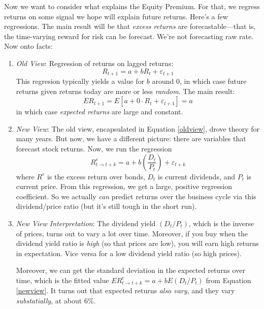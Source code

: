 \documentclass[12pt]{article}
\theoremstyle{plain}
\theoremstyle{definition}
\theoremstyle{remark}
\begin{document}
Now we want to consider what explains the Equity Premium. For that,
we regress returns on some signal we hope will explain future returns.
Here's a few regressions. The main result will be that
\emph{excess returns} are forecastable---that is, the time-varying
reward for risk can be forecast. We're not forecasting raw rate.
Now onto facts:
\begin{enumerate}
    \item {\sl Old View}: Regression of returns on lagged returns:
	    \[ R_{t+1} = a + b R_t + \varepsilon_{t+1} \]
	This regresion typically yields a value for $b$ around
	0, in which case future returns given returns today
	are more or less \emph{random}.  The main result:
	\begin{equation}
	    \label{oldview}
	    ER_{t+1} = E[a + 0\cdot R_t + \varepsilon_{t+1}] = a
	\end{equation}
	in which case \emph{expected returns} are large and constant.
    \item {\sl New View}: The old view, encapsulated in Equation \ref{oldview},
	drove theory for many years. But now, we have a different
	picture: there are variables that forecast stock returns.
	Now, we run the regression
	\begin{equation}
	    \label{newview}
	    R^e_{t\rightarrow t+k} = a + b \left(\frac{D_t}{P_t}\right)
		+ \varepsilon_{t+k}
	\end{equation}
	where $R^e$ is the excess return over bonds, $D_t$ is current
	dividends, and $P_t$ is current price. From this regression,
	we get a large, positive regression coefficient.
	So we actually \emph{can} predict returns over the business
	cycle via this dividend/price ratio (but it's still tough
	in the short run).

    \item {\sl New View Interpretation}: The dividend yield $(D_t/P_t)$, which
	is the inverse of prices, turns out to vary a lot over time.
	Moreover, if you buy when the dividend yield ratio is
	\emph{high} (so that prices are low), you will earn high
	returns in expectation.  Vice versa for a low dividend yield
	ratio (so high prices).

	Moreover, we can get the standard deviation in the expected returns over
	time, which is the fitted value $ER^e_{t\rightarrow t+k} = a + b
	E\left(D_t/P_t\right)$ from Equation \ref{newview}. It turns
	out that expected returns \emph{also vary}, and they vary
	\emph{substatially}, at about 6\%.


\end{enumerate}
\end{document}
